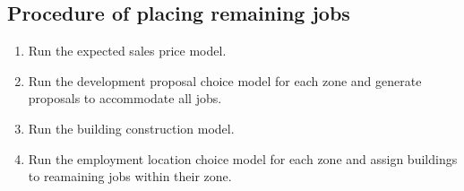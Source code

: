 \documentclass[11pt]{article}
\begin{document}
\subsection{Procedure of placing remaining jobs}
 \begin{enumerate}
\item Run the expected sales price model.
\item Run the development proposal choice model for each zone and generate proposals to accommodate all jobs.
\item Run the building construction model.
\item Run the employment location choice model for each zone and assign buildings to reamaining jobs within their zone.
\end{enumerate}
\end{document}

